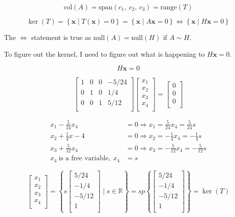 \documentclass[
]{article}
\begin{document}
$$\text{col}(A) = \text{span}\left( c_{1},\ c_{2},\ c_{3} \right) = \text{range}(T)$$

$$\ker(T) = \left\{ \mathbf{x}\mid T\left( \mathbf{x} \right) = 0 \right\} = \left\{ \mathbf{x}\mid A\mathbf{x} = 0 \right\} \Leftrightarrow \left\{ \mathbf{x}\mid H\mathbf{x} = 0 \right\}$$

The $\Leftrightarrow$ statement is true as
$\text{null}{(A)} = \text{null}(H)$ if $A\sim H$.

To figure out the kernel, I need to figure out what is happening to
$H\mathbf{x} = 0$.

$$H\mathbf{x} = 0$$

$$\begin{bmatrix}
1 & 0 & 0 & - 5/24 \\
0 & 1 & 0 & 1/4 \\
0 & 0 & 1 & 5/12 \\
\end{bmatrix}\begin{bmatrix}
x_{1} \\
x_{2} \\
x_{3} \\
x_{4} \\
\end{bmatrix} = \begin{bmatrix}
0 \\
0 \\
0 \\
\end{bmatrix}$$

\begin{align*}
x_{1} - \frac{5}{24}x_{4} &= 0 \Rightarrow x_{1} = \frac{5}{24}x_{4} = \frac{5}{24}s
 \\
x_{2} + \frac{1}{4}x - 4 &= 0 \Rightarrow x_{2} = - \frac{1}{4}x_{4} = - \frac{1}{4}s
 \\
x_{3} + \frac{5}{12}x_{4} &= 0 \Rightarrow x_{3} = - \frac{5}{12}x_{4} = - \frac{5}{12}s
 \\
x_{4}\ \text{is\ a\ free\ variable},\ x_{4} &= s
\end{align*}


$$\begin{bmatrix}
x_{1} \\
x_{2} \\
x_{3} \\
x_{4} \\
\end{bmatrix} = \left\{ s\begin{bmatrix}
5/24 \\
 - 1/4 \\
 - 5/12 \\
1 \\
\end{bmatrix}\mid s\mathbb{\in R} \right\} = sp\left\{ \begin{bmatrix}
5/24 \\
 - 1/4 \\
 - 5/12 \\
1 \\
\end{bmatrix} \right\} = \ker(T)$$
\end{document}
